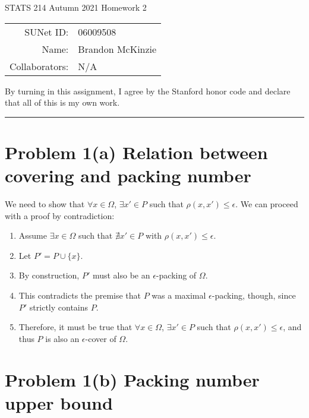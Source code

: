 \documentclass[11pt]{article}
\newcommand{\1}{\mathbb{I}} %
\begin{document}
	
	\begin{center}
		{\Large STATS 214 Autumn 2021 Homework 2}
		
		\begin{tabular}{rl}
			SUNet ID: & 06009508 \\
			Name: & Brandon McKinzie \\
			Collaborators: & N/A
		\end{tabular}
	\end{center}
	
	\p By turning in this assignment, I agree by the Stanford honor code and declare
	that all of this is my own work.
	
	\rule{\linewidth}{0.4pt}
	
\section*{Problem 1(a) Relation between covering and packing number}
	
We need to show that $\forall x \in \Omega$, $\exists x' \in P$ such that $\rho(x, x') \leq \epsilon$. We can proceed with a proof by contradiction:
\begin{enumerate}
	\item Assume $\exists x \in \Omega$ such that $\nexists x' \in P$ with $\rho(x, x') \leq \epsilon$. 
	
	\item Let $P' = P \cup \{ x \}$. 
	
	\item By construction, $P'$ must also be an $\epsilon$-packing of $\Omega$. 
	
	\item This contradicts the premise that $P$ was a maximal $\epsilon$-packing, though, since $P'$ strictly contains $P$. 
	
	\item Therefore, it must be true that $\forall x \in \Omega$, $\exists x' \in P$ such that $\rho(x, x') \leq \epsilon$, and thus $P$ is also an $\epsilon$-cover  of $\Omega$. 
\end{enumerate}


\clearpage
\section*{Problem 1(b) Packing number upper bound}
\end{document}
